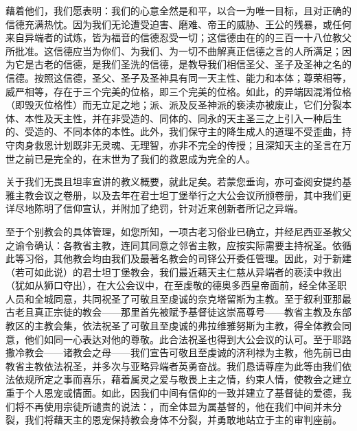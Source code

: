 藉着他们，我们愿表明：我们的心意全然是和平，以合一为唯一目标，且对正确的信德充满热忱。因为我们无论遭受迫害、磨难、帝王的威胁、王公的残暴，或任何来自异端者的试炼，皆为福音的信德忍受一切；这信德由在的的三百一十八位教父所批准。这信德应当为你们、为我们、为一切不曲解真正信德之言的人所满足；因为它是古老的信德，是我们圣洗的信德，是教导我们相信圣父、圣子及圣神之名的信德。按照这信德，圣父、圣子及圣神具有同一天主性、能力和本体；尊荣相等，威严相等，存在于三个完美的位格，即三个完美的位格。如此，的异端因混淆位格（即毁灭位格性）而无立足之地；派、派及反圣神派的亵渎亦被废止，它们分裂本体、本性及天主性，并在非受造的、同体的、同永的天主圣三之上引入一种后生的、受造的、不同本体的本性。此外，我们保守主的降生成人的道理不受歪曲，持守肉身救恩计划既非无灵魂、无理智，亦非不完全的传授；且深知天主的圣言在万世之前已是完全的，在末世为了我们的救恩成为完全的人。\par

关于我们无畏且坦率宣讲的教义概要，就此足矣。若蒙您垂询，亦可查阅安提约基雅主教会议之卷册，以及去年在君士坦丁堡举行之大公会议所颁卷册，其中我们更详尽地陈明了信仰宣认，并附加了绝罚，针对近来创新者所记之异端。\par

至于个别教会的具体管理，如您所知，一项古老习俗业已确立，并经尼西亚圣教父之谕令确认：各教省主教，连同其同意之邻省主教，应按实际需要主持祝圣。依循此等习俗，其他教会均由我们及最著名教会的司铎公开委任管理。因此，对于新建（若可如此说）的君士坦丁堡教会，我们最近藉天主仁慈从异端者的亵渎中救出（犹如从狮口夺出），在大公会议中，在至虔敬的德奥多西皇帝面前，经全体圣职人员和全城同意，共同祝圣了可敬且至虔诚的奈克塔留斯为主教。至于叙利亚那最古老且真正宗徒的教会——那里首先被赋予基督徒这崇高尊号——教省主教及东部教区的主教会集，依法祝圣了可敬且至虔诚的弗拉维雅努斯为主教，得全体教会同意，他们如同一心表达对他的尊敬。此合法祝圣也得到大公会议的认可。至于耶路撒冷教会——诸教会之母——我们宣告可敬且至虔诚的济利禄为主教，他先前已由教省主教依法祝圣，并多次与亚略异端者英勇奋战。我们恳请尊座为此等由我们依法依规所定之事而喜乐，藉着属灵之爱与敬畏上主之情，约束人情，使教会之建立重于个人恩宠或情面。如此，因我们中间有信仰的一致并建立了基督徒的爱德，我们将不再使用宗徒所谴责的说法：，而全体显为属基督的，他在我们中间并未分裂，我们将藉天主的恩宠保持教会身体不分裂，并勇敢地站立于主的审判座前。\par

